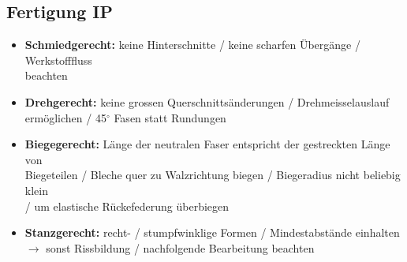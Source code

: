 \subsection{Fertigung \hfill IP}
    \begin{scriptsize}
        \begin{itemize}
            \item \textbf{Schmiedgerecht:} keine Hinterschnitte / keine scharfen Übergänge / Werkstofffluss \\beachten
            \item \textbf{Drehgerecht:} keine grossen Querschnittsänderungen / Drehmeisselauslauf \\ermöglichen / 45$^\circ$ Fasen statt Rundungen
            \item \textbf{Biegegerecht:} Länge der neutralen Faser entspricht der gestreckten Länge von \\Biegeteilen / Bleche quer zu Walzrichtung biegen / Biegeradius nicht beliebig klein \\/ um elastische Rückefederung überbiegen 
            \item \textbf{Stanzgerecht:} recht- / stumpfwinklige Formen / Mindestabstände einhalten \\$\to$ sonst Rissbildung / nachfolgende Bearbeitung beachten
        \end{itemize}
    \end{scriptsize}
